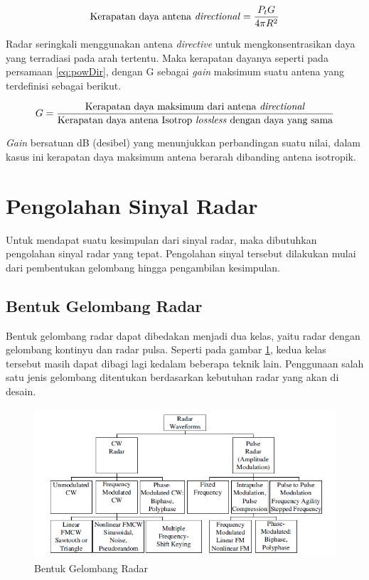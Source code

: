 \begin{equation}
	\text{Kerapatan daya antena \textit{directional}} = \frac{P_{t} G}{4\pi R^{2}}
	\label{eq:powDir}
\end{equation}

Radar seringkali menggunakan antena \textit{directive} untuk mengkonsentrasikan daya yang terradiasi pada arah tertentu. Maka kerapatan dayanya seperti pada persamaan \ref{eq:powDir}, dengan G sebagai \textit{gain} maksimum suatu antena yang terdefinisi sebagai berikut.

\begin{equation}
	G  = \frac{\text{Kerapatan daya maksimum dari antena \textit{directional}}}{\text{Kerapatan daya antena Isotrop \textit{lossless} dengan daya yang sama}}
\end{equation}

\textit{Gain} bersatuan dB (desibel) yang menunjukkan perbandingan suatu nilai, dalam kasus ini kerapatan daya maksimum antena berarah dibanding antena isotropik.

\section{Pengolahan Sinyal Radar}
Untuk mendapat suatu kesimpulan dari sinyal radar, maka dibutuhkan pengolahan sinyal radar yang tepat. Pengolahan sinyal tersebut dilakukan mulai dari pembentukan gelombang hingga pengambilan kesimpulan. 

\subsection{Bentuk Gelombang Radar}

Bentuk gelombang radar dapat dibedakan menjadi dua kelas, yaitu radar dengan gelombang kontinyu dan radar pulsa. Seperti pada gambar \ref{pic:bentukgelradar}, kedua kelas tersebut masih dapat dibagi lagi kedalam beberapa teknik lain. Penggunaan salah satu jenis gelombang ditentukan berdasarkan kebutuhan radar yang akan di desain. 

\begin{figure}
	\begin{center}
		\includegraphics[scale=0.8]{pics/bab2/radarwaveform.png}
		\caption[Bentuk Gelombang Radar]{Bentuk Gelombang Radar \cite{Melvin2014}}
		\label{pic:bentukgelradar}
	\end{center}
\end{figure}


